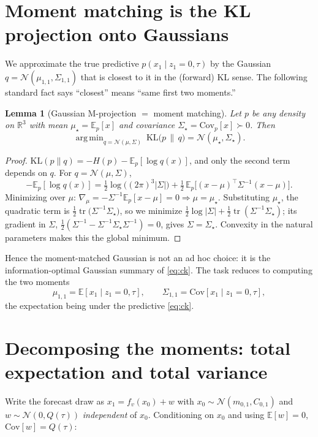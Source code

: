\documentclass[11pt]{article}
\newcommand{\R}{\mathbb{R}}
\newcommand{\E}{\mathbb{E}}
\newcommand{\Cov}{\mathrm{Cov}}
\newcommand{\Norm}{\mathcal{N}}
\newcommand{\KL}{\mathrm{KL}}
\DeclareMathOperator*{\argmin}{arg\,min}
\DeclareMathOperator{\tr}{tr}
\newtheorem{lemma}{Lemma}
\begin{document}
\section{Moment matching is the KL projection onto Gaussians}
\label{sec:mm}

We approximate the true predictive $p(x_1\mid z_1{=}0,\tau)$ by the Gaussian
$q=\Norm(\mu_{1,1},\Sigma_{1,1})$ that is closest to it in the (forward) KL sense. The
following standard fact says ``closest'' means ``same first two moments.''

\begin{lemma}[Gaussian M-projection $=$ moment matching]
\label{lem:mproj}
Let $p$ be any density on $\R^3$ with mean $\mu_\star=\E_p[x]$ and covariance
$\Sigma_\star=\Cov_p[x]\succ0$. Then
\[
\argmin_{q=\Norm(\mu,\Sigma)}\ \KL\!\big(p\,\|\,q\big)
=\Norm(\mu_\star,\Sigma_\star).
\]
\end{lemma}

\begin{proof}
$\KL(p\|q)=-H(p)-\E_p[\log q(x)]$, and only the second term depends on $q$. For
$q=\Norm(\mu,\Sigma)$,
\[
-\E_p[\log q(x)]=\tfrac12\log\!\big((2\pi)^3|\Sigma|\big)
+\tfrac12\,\E_p\!\big[(x-\mu)^\top\Sigma^{-1}(x-\mu)\big].
\]
Minimizing over $\mu$: $\nabla_\mu=-\Sigma^{-1}\E_p[x-\mu]=0\Rightarrow\mu=\mu_\star$.
Substituting $\mu_\star$, the quadratic term is
$\tfrac12\tr\!\big(\Sigma^{-1}\Sigma_\star\big)$, so we minimize
$\tfrac12\log|\Sigma|+\tfrac12\tr(\Sigma^{-1}\Sigma_\star)$; its gradient in $\Sigma$,
$\tfrac12(\Sigma^{-1}-\Sigma^{-1}\Sigma_\star\Sigma^{-1})=0$, gives
$\Sigma=\Sigma_\star$. Convexity in the natural parameters makes this the global
minimum.
\end{proof}

Hence the moment-matched Gaussian is not an ad hoc choice: it is the information-optimal
Gaussian summary of \eqref{eq:ck}. The task reduces to computing the two moments
\begin{equation}
\label{eq:targetmoments}
\mu_{1,1}=\E[x_1\mid z_1{=}0,\tau],\qquad
\Sigma_{1,1}=\Cov[x_1\mid z_1{=}0,\tau],
\end{equation}
the expectation being under the predictive \eqref{eq:ck}.

\section{Decomposing the moments: total expectation and total variance}
\label{sec:decomp}

Write the forecast draw as $x_1=f_v(x_0)+w$ with $x_0\sim\Norm(m_{0,1},C_{0,1})$ and
$w\sim\Norm(0,Q(\tau))$ \emph{independent} of $x_0$. Conditioning on $x_0$ and using
$\E[w]=0$, $\Cov[w]=Q(\tau)$:
\end{document}
